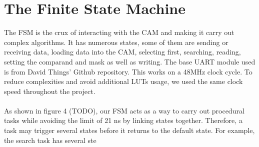 \section{The Finite State Machine}
The FSM is the crux of interacting with the CAM and making it carry out complex algorithms. 
It has numerous states, some of them are sending or receiving data, loading data into the CAM, selecting first, searching, reading, setting the comparand and mask as well as writing. 
The base UART module used is from David Things' Github repository. \cite{uart} This works on a 48MHz clock cycle.
To reduce complexities and avoid additional LUTs usage, we used the same clock speed throughout the project. 
\\\\
As shown in figure 4 (TODO), our FSM acts as a way to carry out procedural tasks while avoiding the limit of 21 ns by linking states together. 
Therefore, a task may trigger several states before it returns to the default state. 
For example, the search task has several ste